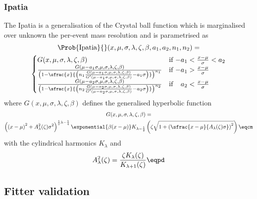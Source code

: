 \subsubsection{Ipatia}
The Ipatia \PDF \cite{Santos:2013gra} is a generalisation of the Crystal ball
function which is marginalised over unknown the per-event mass resolution and is
parametrised as
%
\begin{multline}\label{sec:measurement_of_sin2beta:likelihood_fit:pdfs:ipatia}
  \Prob{\text{Ipatia}}{}(x, \mu, \sigma, \lambda, \zeta, \beta, a_1, a_2, n_1, n_2) = \\
    \begin{cases}
      G(x, \mu, \sigma, \lambda, \zeta, \beta)    & \text{if $-a_1 < \frac{x-\mu}{\sigma} < a_2$} \\
      \frac{G(\mu - a_1 \sigma, \mu, \sigma, \lambda, \zeta, \beta)}{
        \left( 1 - \sfrac{x}{\left( n_1 \frac{G(\mu - a_1 \sigma, \mu, \sigma, \lambda, \zeta, \beta)}{G^\prime(\mu - a_1 \sigma, \mu, \sigma, \lambda, \zeta, \beta)} - a_1 \sigma \right)} \right)^{n_1}
      }     & \text{if $-a_1 > \frac{x-\mu}{\sigma}$} \\
      \frac{G(\mu - a_2 \sigma, \mu, \sigma, \lambda, \zeta, \beta)}{
        \left( 1 - \sfrac{x}{\left( n_2 \frac{G(\mu - a_2 \sigma, \mu, \sigma, \lambda, \zeta, \beta)}{G^\prime(\mu - a_2 \sigma, \mu, \sigma, \lambda, \zeta, \beta)} - a_2 \sigma \right)} \right)^{n_2}
      }     & \text{if $\phantom{-}a_2 < \frac{x-\mu}{\sigma}$} \\
  \end{cases}
\end{multline}
%
where $G(x, \mu, \sigma, \lambda, \zeta, \beta)$ defines the generalised hyperbolic function
\begin{multline}\label{sec:measurement_of_sin2beta:likelihood_fit:pdfs:generalised_hyperbolic}
  G(x, \mu, \sigma, \lambda, \zeta, \beta) = \\
  \left(\left(x - \mu\right)^2 + A_\lambda^2(\zeta) \sigma^2 \right)^{\frac{1}{2} \lambda - \frac{1}{4}}
  \exponential{\beta (x - \mu)} K_{\lambda-\frac{1}{2}}
  \left(\zeta \sqrt{1 + \left(\sfrac{x - \mu}{A_\lambda(\zeta) \sigma}\right)^2} \right)\eqcm
\end{multline}
%
with the cylindrical harmonics $K_\lambda$ and
%
\begin{equation}
  A_\lambda^2(\zeta) = \frac{\zeta K_\lambda(\zeta)}{K_{\lambda+1}(\zeta)}\eqpd
\end{equation}
%


\newpage




\subsection{Fitter validation}
\label{sec:measurement_of_sin2beta:likelihood_fit:validation}
